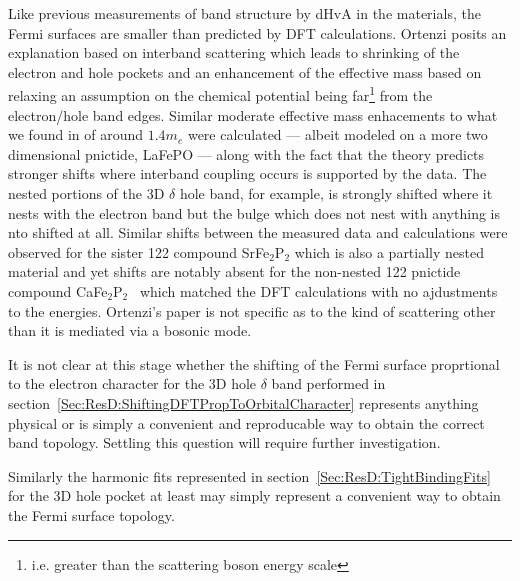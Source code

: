 


Like previous measurements of band structure by \ac{dHvA} in the \BaFePAs materials, the Fermi surfaces are smaller than predicted by \ac{DFT} calculations\cite{Shishido2010, Analytis2010c}. Ortenzi \etal\cite{Ortenzi2009} posits an explanation based on interband scattering which leads to shrinking of the electron and hole pockets and an enhancement of the effective mass based on relaxing an assumption on the chemical potential being far\footnote{i.e. greater than the scattering boson energy scale} from the electron/hole band edges. Similar moderate effective mass enhacements to what we found in \BaFeP of around $1.4m_e$ were calculated --- albeit modeled on a more two dimensional pnictide, LaFePO --- along with the fact that the theory predicts stronger shifts where interband coupling occurs is supported by the \BaFeP data. The nested portions of the 3D $\delta$ hole band, for example, is strongly shifted where it nests with the electron band but the bulge which does not nest with anything is nto shifted at all. Similar shifts between the measured data and calculations were observed for the sister 122 compound SrFe$_2$P$_2$\cite{Analytis2009} which is also a partially nested material and yet shifts are notably absent for the non-nested 122 pnictide compound CaFe$_2$P$_2$~\cite{Coldea2009} which matched the \ac{DFT} calculations with no ajdustments to the energies. Ortenzi's paper is not specific as to the kind of scattering other than it is mediated via a bosonic mode.

It is not clear at this stage whether the shifting of the Fermi surface proprtional to the electron character for the 3D hole $\delta$ band performed in section~\ref{Sec:ResD:ShiftingDFTPropToOrbitalCharacter} represents anything physical or is simply a convenient and reproducable way to obtain the correct band topology. Settling this question will require further investigation. 

Similarly the harmonic fits represented in section~\ref{Sec:ResD:TightBindingFits} for the 3D hole pocket at least may simply represent a convenient way to obtain the Fermi surface topology.


